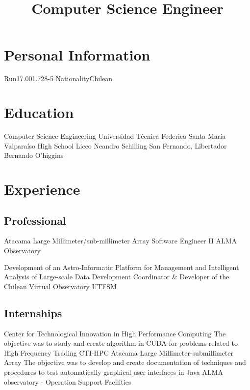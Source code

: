 \documentclass[11pt,a4paper]{moderncv}
\title{Computer Science Engineer}
\begin{document}
\maketitle

\section{Personal Information}
		{Run}{17.001.728-5}
						{Nationality}{Chilean}
							{}{}

\section{Education}
	{Computer Science Engineering}
	{Universidad Técnica Federico Santa María}
	{Valparaíso}
	{}
	{}
	{High School}
	{Liceo Neandro Schilling}
	{San Fernando, Libertador Bernando O'higgins}
	{}{}
\vspace{0.5cm}

\section{Experience}
\subsection{Professional}
	{Atacama Large Millimeter/sub-millimeter Array}
	{Software Engineer II}
	{ALMA Observatory}
	{}{}

	{Development of an Astro-Informatic Platform for Management and Intelligent Analysis of Large-scale Data}
	{Development Coordinator \& Developer of the Chilean Virtual Observatory}
	{UTFSM}
	{}{}

\subsection{Internships}
	{Center for Technological Innovation in High Performance Computing}
	{The objective was to study and create algorithm in CUDA for problems related to High Frequency Trading}
	{CTI-HPC}
	{}{}
	{Atacama Large Millimeter-submillimeter Array}
	{The objective was to develop and create documentation of techniques and
	procedures to test automatically graphical user interfaces in Java}
	{ALMA observatory - Operation Support Facilities}
	{}{}
\end{document}
